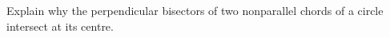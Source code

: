 Explain why the perpendicular bisectors of two nonparallel chords of a circle intersect at its centre.
